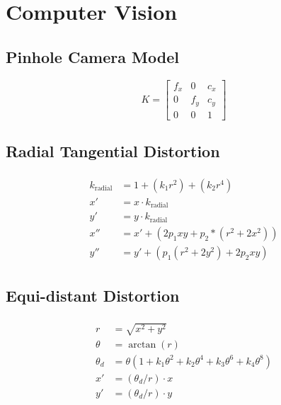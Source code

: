 \documentclass{article}
\begin{document}
\newpage
\section{Computer Vision}

\subsection{Pinhole Camera Model}

\begin{equation}
  K =
  \begin{bmatrix}
    f_x & 0 & c_x \\
    0 & f_y & c_y \\
    0 & 0 & 1
  \end{bmatrix}
\end{equation}

\subsection{Radial Tangential Distortion}

\begin{align}
\begin{split}
  k_{\text{radial}} &= 1 + (k_1 r^2) + (k_2 r^4) \\
  x' &= x \cdot k_{\text{radial}} \\
  y' &= y \cdot k_{\text{radial}} \\
  x'' &= x' + (2 p_1 x y + p_2 * (r^2 + 2 x^2)) \\
  y'' &= y' + (p_1 (r^2 + 2 y^2) + 2 p_2 x y)
\end{split}
\end{align}

\subsection{Equi-distant Distortion}

\begin{align}
\begin{split}
  r &= \sqrt{x^{2} + y^{2}} \\
  \theta &= \arctan{(r)} \\
  \theta_d &= \theta (1 + k_1 \theta^2 + k_2 \theta^4 + k_3 \theta^6 + k_4 \theta^8) \\
  x' &= (\theta_d / r) \cdot x \\
  y' &= (\theta_d / r) \cdot y
\end{split}
\end{align}
\end{document}
